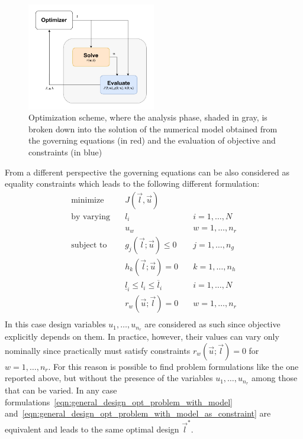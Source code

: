 \begin{figure}
	\centering
	\includegraphics[width=0.5\textwidth]{img/whole_opt_probl.pdf}
	\caption{Optimization scheme, where the analysis phase, shaded in gray, is broken down into the solution of the numerical model obtained from the governing equations (in red) and the evaluation of objective and constraints (in blue)}
	\label{fig:whole_opt_probl}
\end{figure}

From a different perspective the governing equations can be also considered as equality constraints which leads to the following different formulation:
\begin{equation}
\label{eqn:general_design_opt_problem_with_model_as_constraint}
\begin{aligned}
	\text{minimize}   & \quad J(\vec{l}, \vec{u})														   \\
	\text{by varying} & \quad l_i  & \quad i=1, \dots, N    \\
					  & \quad u_w & \quad w = 1, \dots, n_r  \\
	\text{subject to} & \quad g_j(\vec{l}; \vec{u})	\le 0							  & \quad j=1, \dots, n_g  \\
	& \quad h_k(\vec{l}; \vec{u}) = 0								  & \quad k=1, \dots, n_h  \\
	& \quad \underline{l}_i \le l_i \le \overline{l}_i  & \quad i=1, \dots, N \\
	& \quad r_w(\vec{u}; \vec{l}) = 0 & \quad w = 1, \dots, n_r  \\
\end{aligned}
\end{equation}
In this case design variables $u_1, \dots, u_{n_r}$ are considered as such since objective explicitly depends on them.
In practice, however, their values can vary only nominally since practically must satisfy constraints $ r_w(\vec{u}; \vec{l}) = 0$ for $ w = 1, \dots, n_r $. For this reason is possible to find problem formulations like the one reported above, but without the presence of the variables $u_1, \dots, u_{n_r}$ among those that can be varied. In any case formulations~\eqref{eqn:general_design_opt_problem_with_model} and~\eqref{eqn:general_design_opt_problem_with_model_as_constraint} are equivalent and leads to the same optimal design $\vec{l}^*$.


